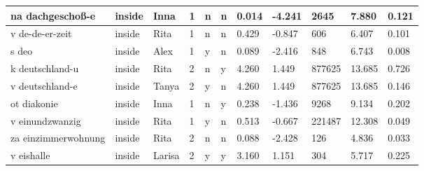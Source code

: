 \begin{longtable}{|p{4cm}|p{1cm}|p{1.2cm}|p{0.5cm}|p{0.5cm}|p{0.5cm}|R{1cm}|R{1cm}|R{1cm}|R{1cm}|R{1cm}|}
na dachgescho\ss{}-e       & inside            & Inna          & 1                                   & n                          & n                          & 0.014      & -4.241        & 2645                    & 7.880                         & 0.121                   \\ \hline
v de-de-er-zeit            & inside            & Rita          & 1                                   & n                          & n                          & 0.429      & -0.847        & 606                     & 6.407                         & 0.101                   \\ \hline
s deo                      & inside            & Alex          & 1                                   & y                          & n                          & 0.089      & -2.416        & 848                     & 6.743                         & 0.008                   \\ \hline
k deutschland-u            & inside            & Rita          & 2                                   & n                          & y                          & 4.260      & 1.449         & 877625                  & 13.685                        & 0.726                   \\ \hline
v deutschland-e            & inside            & Tanya         & 2                                   & y                          & n                          & 4.260      & 1.449         & 877625                  & 13.685                        & 0.146                   \\ \hline
ot diakonie                & inside            & Inna          & 1                                   & n                          & y                          & 0.238      & -1.436        & 9268                    & 9.134                         & 0.202                   \\ \hline
v einundzwanzig            & inside            & Rita          & 1                                   & y                          & n                          & 0.513      & -0.667        & 221487                  & 12.308                        & 0.049                   \\ \hline
za einzimmerwohnung        & inside            & Rita          & 2                                   & n                          & n                          & 0.088      & -2.428        & 126                     & 4.836                         & 0.033                   \\ \hline
v eishalle                 & inside            & Larisa        & 2                                   & y                          & y                          & 3.160      & 1.151         & 304                     & 5.717                         & 0.225                   \\ \hline

\end{longtable}
